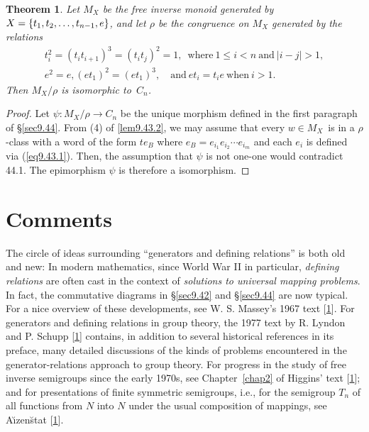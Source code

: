 \documentclass{surv-l}
\numberwithin{equation}{section}
\numberwithin{table}{section}
\numberwithin{figure}{section}
\newtheorem{theorem}[equation]{Theorem}
\theoremstyle{definition}
\begin{document}
\begin{theorem}\label{thm9.44.3}
Let $M_{X}$ be the free inverse monoid generated by $X =\break\{t_{1},
t_{2},\ldots, t_{n-1}, e\}$, and let $\rho$ be the congruence on
$M_{X}$ generated by the relations
\begin{gather*}
t_{i}^{2} =(t_{i}t_{i+1})^{3}=(t_{i}t_{j})^{2}=1,\enspace \text{where}\
1\leq i<n\ \text{and}\ |i-j|>1,\\
e^{2} =e, (et_{1})^{2}=(et_{1})^{3},\quad \text{and}\ et_{i}=t_{i}e\ \text{when}\ i>1.\quad
\end{gather*}
Then $M_{X}/\rho$ is isomorphic to~$C_{n}$.
\end{theorem}

\begin{proof} Let $\psi : M_{X}/\rho\rightarrow C_{n}$ be the unique
morphism defined in the first paragraph of \S\ref{sec9.44}. From
(4) of \ref{lem9.43.2}, we may assume that every $w\in M_{X}$~is
in a $\rho$-class with a word of the form $te_{B}$ where
$e_{B}=e_{i_{1}}e_{i_{2}}\cdots e_{i_{m}}$ and each $e_{i}$ is
defined via (\ref{eq9.43.1}). Then, the assumption that $\psi$ is
not one-one would contradict 44.1. The epimorphism $\psi$ is
therefore a isomorphism.
\end{proof}

\section{Comments}\label{sec9.45}

The circle of ideas surrounding ``generators and defining
relations'' is both old and new: In modern mathematics, since
World War II in particular, \emph{defining relations} are often
cast in the context of \emph{solutions to universal mapping
problems}. In fact, the commutative diagrams in \S\ref{sec9.42}
and \S\ref{sec9.44} are now typical. For a nice overview of these
developments, see W. S. Massey's\index{Massey, W.S.} 1967 text
[\hyperlink{bib50}{1}]. For generators and defining
relations in group theory, the 1977 text by R.
Lyndon and P. Schupp
[\hyperlink{bib48}{1}] contains, in addition to several
historical references in its preface, many detailed discussions of
the kinds of problems encountered in the generator-relations
approach to group theory. For progress in the study of free
inverse semigroups since the early 1970s, see Chapter~\ref{chap2}
of Higgins' text [\hyperlink{bib28}{1}]; and for
presentations of finite symmetric semigroups, i.e., for the
semigroup $T_{n}$ of all functions from $N$ into $N$ under the
usual composition of mappings, see A\u{\i}zen\u{s}tat [\hyperlink{bib1}{1}].
\end{document}
